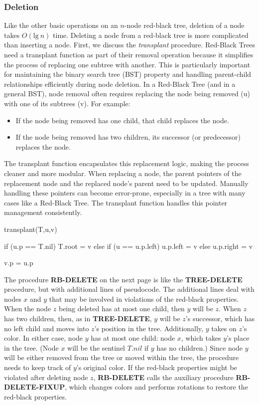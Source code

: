 \documentclass{report}
\begin{document}
\subsubsection{Deletion}
\bigbreak \noindent 
Like the other basic operations on an $n$-node red-black tree, deletion of a node takes $O(\text{lg}\ n)$ time. Deleting a node from a red-black tree is more complicated than inserting a node.
\bigbreak \noindent 
First, we discuss the \textit{transplant} procedure. Red-Black Trees need a transplant function as part of their removal operation because it simplifies the process of replacing one subtree with another. This is particularly important for maintaining the binary search tree (BST) property and handling parent-child relationships efficiently during node deletion.
\bigbreak \noindent 
In a Red-Black Tree (and in a general BST), node removal often requires replacing the node being removed (u) with one of its subtrees (v). For example:
\begin{itemize}
    \item If the node being removed has one child, that child replaces the node.
    \item If the node being removed has two children, its successor (or predecessor) replaces the node.
\end{itemize}
The transplant function encapsulates this replacement logic, making the process cleaner and more modular.
\bigbreak \noindent 
When replacing a node, the parent pointers of the replacement node and the replaced node's parent need to be updated. Manually handling these pointers can become error-prone, especially in a tree with many cases like a Red-Black Tree. The transplant function handles this pointer management consistently.
\bigbreak \noindent 
\begin{cppcode}
    transplant(T,u,v) {
        if (u.p == T.nil)
            T.root = v
        else if (u == u.p.left)
            u.p.left = v
        else u.p.right = v

        v.p = u.p
    }
\end{cppcode}
\bigbreak \noindent 
The procedure \textbf{RB-DELETE} on the next page is like the \textbf{TREE-DELETE} procedure, but with additional lines of pseudocode. The additional lines deal with nodes \(x\) and \(y\) that may be involved in violations of the red-black properties. When the node \(z\) being deleted has at most one child, then \(y\) will be \(z\). When \(z\) has two children, then, as in \textbf{TREE-DELETE}, \(y\) will be \(z\)'s successor, which has no left child and moves into \(z\)'s position in the tree. Additionally, \(y\) takes on \(z\)'s color. In either case, node \(y\) has at most one child: node \(x\), which takes \(y\)'s place in the tree. (Node \(x\) will be the sentinel \(T.nil\) if \(y\) has no children.) Since node \(y\) will be either removed from the tree or moved within the tree, the procedure needs to keep track of \(y\)'s original color. If the red-black properties might be violated after deleting node \(z\), \textbf{RB-DELETE} calls the auxiliary procedure \textbf{RB-DELETE-FIXUP}, which changes colors and performs rotations to restore the red-black properties.
\end{document}

